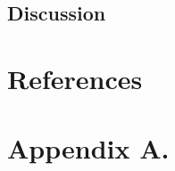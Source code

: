 \documentclass[twoside,11pt]{article}
\begin{document}



\subsection{Discussion}






\section {References}

\newpage

\appendix
\section*{Appendix A.}

\vskip 0.2in


\end{document}
